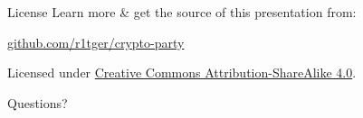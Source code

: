 \documentclass[aspectratio=169]{beamer}
\begin{document}
    \begin{frame}{License}
        Learn more \& get the source of this presentation from:
        \begin{center}\url{github.com/r1tger/crypto-party}\end{center}
        Licensed under \href{http://creativecommons.org/licenses/by-sa/4.0/}{Creative Commons Attribution-ShareAlike 4.0}.
        \begin{center}\ccbysa\end{center}
    \end{frame}

    \begin{frame}[standout]
        Questions?
    \end{frame}
\end{document}
